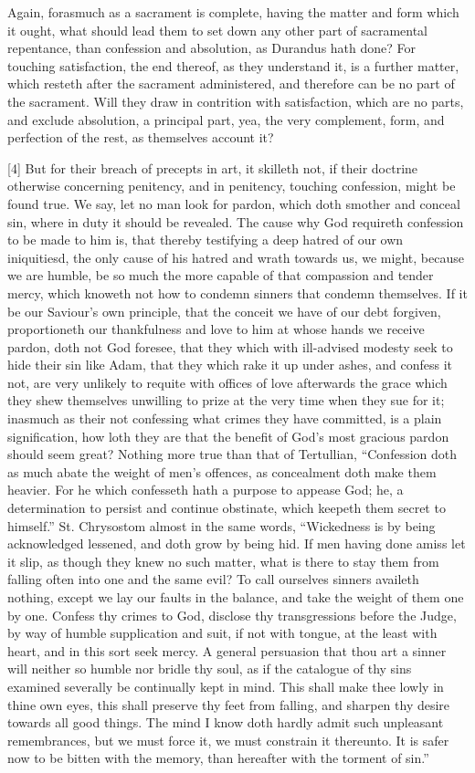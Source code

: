 Again, forasmuch as a sacrament is complete, having the matter and form which it ought, what should lead them to set down any other part of sacramental repentance, than confession and absolution, as Durandus hath done? For touching satisfaction, the end thereof, as they understand it, is a further matter, which resteth after the sacrament administered, and therefore can be no part of the sacrament. Will they draw in contrition with satisfaction, which are no parts, and exclude absolution, a principal part, yea, the very complement, form, and perfection of the rest, as themselves account it?

[4] But for their breach of precepts in art, it skilleth not, if their doctrine otherwise concerning penitency, and in penitency, touching confession, might be found true. We say, let no man look for pardon, which doth smother and conceal sin, where in duty it should be revealed. The cause why God requireth confession to be made to him is, that thereby testifying a deep hatred of our own iniquitiesd, the only cause of his hatred and wrath towards us, we might, because we are humble, be so much the more capable of that compassion and tender mercy, which knoweth not how to condemn sinners that condemn themselves. If it be our Saviour’s own principle, that the conceit we have of our debt forgiven, proportioneth our thankfulness and love to him at whose hands we receive pardon, doth not God foresee, that they which with ill-advised modesty seek to hide their sin like Adam, that they which rake it up under ashes, and confess it not, are very unlikely to requite with offices of love afterwards the grace which they shew themselves unwilling to prize at the very time when they sue for it; inasmuch as their not confessing what crimes they have committed, is a plain signification, how loth they are that the benefit of God’s most gracious pardon should seem great? Nothing more true than that of Tertullian, “Confession doth as much abate the weight of men’s offences, as concealment doth make them heavier. For he which confesseth hath a purpose to appease God; he, a determination to persist and continue obstinate, which keepeth them secret to himself.” St. Chrysostom almost in the same words, “Wickedness is by being acknowledged lessened, and doth grow by being hid. If men having done amiss let it slip, as though they knew no such matter, what is there to stay them from falling often into one and the same evil? To call ourselves sinners availeth nothing, except we lay our faults in the balance, and take the weight of them one by one. Confess thy crimes to God, disclose thy transgressions before the Judge, by way of humble supplication and suit, if not with tongue, at the least with heart, and in this sort seek mercy. A general persuasion that thou art a sinner will neither so humble nor bridle thy soul, as if the catalogue of thy sins examined severally be continually kept in mind. This shall make thee lowly in thine own eyes, this shall preserve thy feet from falling, and sharpen thy desire towards all good things. The mind I know doth hardly admit such unpleasant remembrances, but we must force it, we must constrain it thereunto. It is safer now to be bitten with the memory, than hereafter with the torment of sin.”

